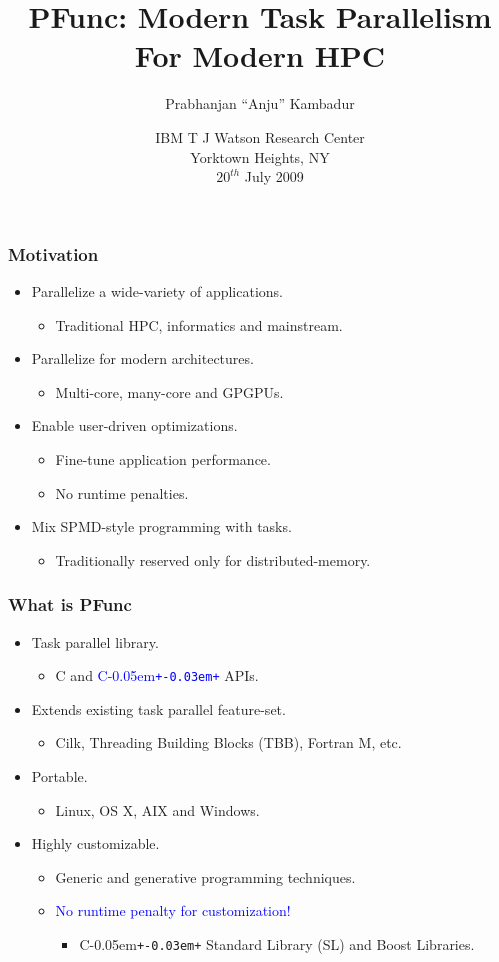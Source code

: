 \documentclass{beamer}
\title{PFunc: Modern Task Parallelism For Modern HPC}
\author{Prabhanjan ``Anju'' Kambadur}
\date{{\small IBM T J Watson Research Center}\\
{\footnotesize Yorktown Heights, NY}\\
$20^{th}$ July 2009}
\newcommand{\Cpp}{C\kern-0.05em\texttt{+\kern-0.03em+}}
\begin{document}
\begin{frame}
  \titlepage
\end{frame}

\begin{frame}
\frametitle{Motivation}
\begin{itemize}
\item Parallelize a wide-variety of applications.
  \begin{itemize}
  \item Traditional HPC, informatics and mainstream.
  \end{itemize}
\item Parallelize for modern architectures.
  \begin{itemize}
  \item Multi-core, many-core and GPGPUs.
  \end{itemize}
\item Enable user-driven optimizations.
  \begin{itemize}
  \item Fine-tune application performance.
  \item No runtime penalties.
  \end{itemize}
\item Mix SPMD-style programming with tasks.
  \begin{itemize}
  \item Traditionally reserved only for distributed-memory.
  \end{itemize}
\end{itemize}
\end{frame}

\begin{frame}
\frametitle{What is PFunc}
\begin{itemize}
\item Task parallel library.
  \begin{itemize}
  \item C and \textcolor{blue}{\Cpp{}} APIs.
  \end{itemize}
\item Extends existing task parallel feature-set. 
  \begin{itemize}
  \item Cilk, Threading Building Blocks (TBB), Fortran M, etc.
  \end{itemize}
\item Portable.
  \begin{itemize}
  \item Linux, OS X, AIX and Windows.
  \end{itemize}
\item Highly customizable.
  \begin{itemize}
  \item Generic and generative programming techniques.
  \item \textcolor{blue}{No runtime penalty for customization!}
    \begin{itemize}
    \item \Cpp{} Standard Library (SL) and Boost Libraries.
    \end{itemize}
  \end{itemize}
\end{itemize}
\end{frame}
\end{document}
